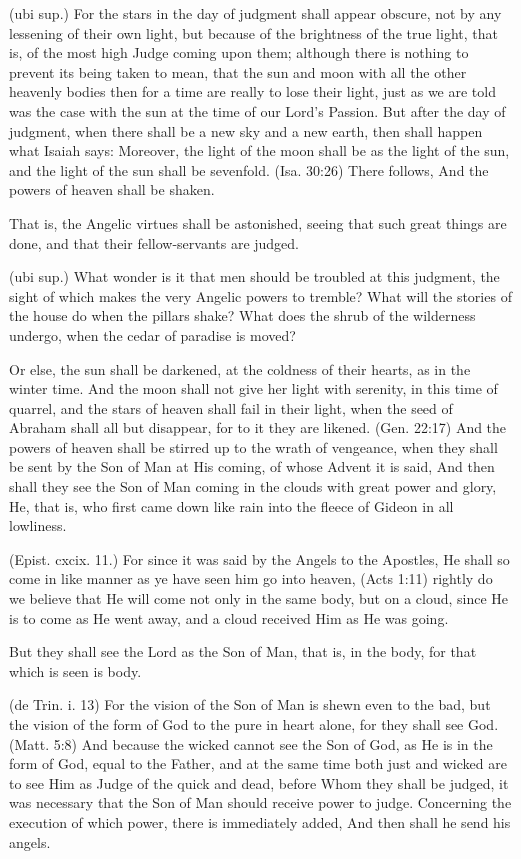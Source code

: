  (ubi sup.) For the stars in the day of judgment shall appear obscure, not by any lessening of their own light, but because of the brightness of the true light, that is, of the most high Judge coming upon them; although there is nothing to prevent its being taken to mean, that the sun and moon with all the other heavenly bodies then for a time are really to lose their light, just as we are told was the case with the sun at the time of our Lord’s Passion. But after the day of judgment, when there shall be a new sky and a new earth, then shall happen what Isaiah says: Moreover, the light of the moon shall be as the light of the sun, and the light of the sun shall be sevenfold. (Isa. 30:26) There follows, And the powers of heaven shall be shaken.

 That is, the Angelic virtues shall be astonished, seeing that such great things are done, and that their fellow-servants are judged.

 (ubi sup.) What wonder is it that men should be troubled at this judgment, the sight of which makes the very Angelic powers to tremble? What will the stories of the house do when the pillars shake? What does the shrub of the wilderness undergo, when the cedar of paradise is moved?

 Or else, the sun shall be darkened, at the coldness of their hearts, as in the winter time. And the moon shall not give her light with serenity, in this time of quarrel, and the stars of heaven shall fail in their light, when the seed of Abraham shall all but disappear, for to it they are likened. (Gen. 22:17) And the powers of heaven shall be stirred up to the wrath of vengeance, when they shall be sent by the Son of Man at His coming, of whose Advent it is said, And then shall they see the Son of Man coming in the clouds with great power and glory, He, that is, who first came down like rain into the fleece of Gideon in all lowliness.

 (Epist. cxcix. 11.) For since it was said by the Angels to the Apostles, He shall so come in like manner as ye have seen him go into heaven, (Acts 1:11) rightly do we believe that He will come not only in the same body, but on a cloud, since He is to come as He went away, and a cloud received Him as He was going.

 But they shall see the Lord as the Son of Man, that is, in the body, for that which is seen is body.

 (de Trin. i. 13) For the vision of the Son of Man is shewn even to the bad, but the vision of the form of God to the pure in heart alone, for they shall see God. (Matt. 5:8) And because the wicked cannot see the Son of God, as He is in the form of God, equal to the Father, and at the same time both just and wicked are to see Him as Judge of the quick and dead, before Whom they shall be judged, it was necessary that the Son of Man should receive power to judge. Concerning the execution of which power, there is immediately added, And then shall he send his angels.

